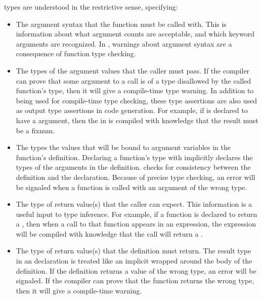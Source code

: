  types are understood in the restrictive sense, specifying:
\begin{itemize}
  
\item The argument syntax that the function must be called with.  This
  is information about what argument counts are acceptable, and which
  keyword arguments are recognized.  In \python, warnings about
  argument syntax are a consequence of function type checking.
  
\item The types of the argument values that the caller must pass.  If
  the compiler can prove that some argument to a call is of a type
  disallowed by the called function's type, then it will give a
  compile-time type warning.  In addition to being used for
  compile-time type checking, these type assertions are also used as
  output type assertions in code generation.  For example, if
   is declared to have a  argument, then the
   in  is compiled with knowledge that
  the result must be a fixnum.
  
\item The types the values that will be bound to argument variables in
  the function's definition.  Declaring a function's type with
   implicitly declares the types of the arguments in the
  definition.  \python{} checks for consistency between the definition
  and the  declaration.  Because of precise type checking,
  an error will be signaled when a function is called with an
  argument of the wrong type.
  
\item The type of return value(s) that the caller can expect.  This
  information is a useful input to type inference.  For example, if a
  function is declared to return a , then when a call to
  that function appears in an expression, the expression will be
  compiled with knowledge that the call will return a .
  
\item The type of return value(s) that the definition must return.
  The result type in an  declaration is treated like an
  implicit  wrapped around the body of the definition.  If
  the definition returns a value of the wrong type, an error will be
  signaled.  If the compiler can prove that the function returns the
  wrong type, then it will give a compile-time warning.
\end{itemize}

